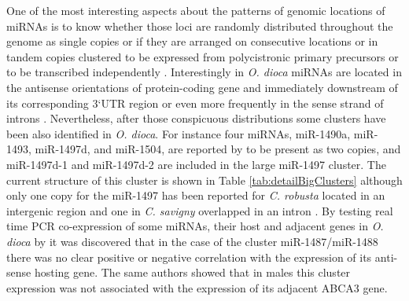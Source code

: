 \documentclass[graybox]{svmult}
\begin{document}
One of the most interesting aspects about the patterns of genomic locations
of miRNAs is to know whether those loci are randomly distributed
throughout the genome as single copies or if they are arranged on
consecutive locations or in tandem copies clustered to be expressed from
polycistronic primary precursors or to be transcribed independently
\citep{Tanzer:10a}. Interestingly in \textit{O. dioca} miRNAs are located in
the antisense orientations of protein-coding gene and immediately
downstream of its corresponding 3`UTR region or even more frequently in the 
sense strand of introns \citep{Fu:08}. Nevertheless, after those conspicuous
distributions some clusters have been also identified in
\textit{O. dioca}. For instance four miRNAs, miR-1490a, miR-1493,
miR-1497d, and miR-1504, are reported by \citet{Fu:08} to be present as
two copies, and miR-1497d-1 and miR-1497d-2 are included in the large
miR-1497 cluster. The current structure of this cluster is shown in Table
\ref{tab:detailBigClusters} although only one copy for the miR-1497 has
been reported for \textit{C. robusta} located in an intergenic region
\citep{Fu:08, Hendrix2010} and one in \textit{C. savigny} overlapped in an
intron \citep{Fu:08}. By testing real time PCR co-expression of some miRNAs,
their host and adjacent genes in \textit{O.  dioca} by \citet{Fu:08} it was
discovered that in the case of the cluster miR-1487/miR-1488 there was no clear 
positive or negative correlation with the expression of its anti-sense
hosting gene. The same authors showed that in males this cluster expression 
was not associated with the expression of its adjacent ABCA3 gene.
\end{document}
